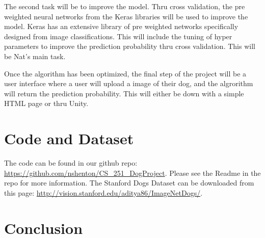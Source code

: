 \documentclass[12pt]{article}
\newcommand{\todo}[1]{\noindent\textcolor{blue}{{$\Box$ #1}}}
\begin{document}
The second task will be to improve the model.  Thru cross validation, the pre weighted neural networks from the Keras libraries will be used to improve the model. Keras has an extensive library of pre weighted networks specifically designed from image classifications.   This will include the tuning of hyper parameters to improve the prediction probability thru cross validation.  This will be Nat's main task.  

Once the algorithm has been optimized, the final step of the project will be a user interface where a user will upload a image of their dog, and the algrorithm will return the prediction probability.  This will either be down with a simple HTML page or thru Unity. 


\section{Code and Dataset}

The code can be found in our github repo: \url{https://github.com/nshenton/CS_251_DogProject}.  Please see the Readme in the repo for more information.  The Stanford Dogs Dataset can be downloaded from this page: \url{http://vision.stanford.edu/aditya86/ImageNetDogs/}.

\section{Conclusion}

{}

\end{document}
